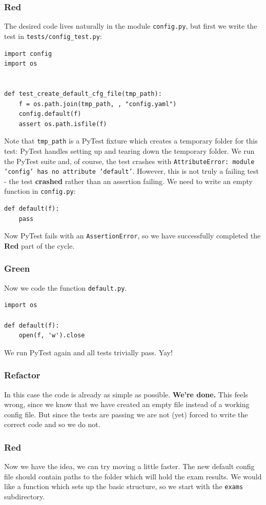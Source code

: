 \documentclass[10pt]{article}
\begin{document}
\subsubsection{Red}
The desired code lives naturally in the module \texttt{config.py}, but first we write the test in \texttt{tests/config\_test.py}:
\begin{lstlisting}
import config
import os


def test_create_default_cfg_file(tmp_path):
    f = os.path.join(tmp_path, , "config.yaml")
    config.default(f)
    assert os.path.isfile(f)
\end{lstlisting}
Note that \texttt{tmp\_path} is a PyTest fixture which creates a temporary folder for this test: PyTest handles setting up and tearing down the temporary folder. We run the PyTest suite and, of course, the test crashes with \texttt{AttributeError: module 'config' has no attribute 'default'}. However, this is not truly a failing test - the test \textbf{crashed} rather than an assertion failing. We need to write an empty function in \texttt{config.py}:
\begin{lstlisting}
def default(f):
    pass
\end{lstlisting}
Now PyTest fails with an \texttt{AssertionError}, so we have successfully completed the \textbf{Red} part of the cycle.

\subsubsection{Green}
Now we code the function \texttt{default.py}.
\begin{lstlisting}
import os

def default(f):
    open(f, 'w').close
\end{lstlisting}
We run PyTest again and all tests trivially pass. Yay!

\subsubsection{Refactor}
In this case the code is already as simple as possible. \textbf{We're done.} This feels wrong, since we know that we have created an empty file instead of a working config file. But since the tests are passing we are not (yet) forced to write the correct code and so we do not.

\subsubsection{Red}
Now we have the idea, we can try moving a little faster. The new default config file should contain paths to the folder which will hold the exam results. We would like a function which sets up the basic structure, so we start with the \texttt{exams} subdirectory.
\end{document}

